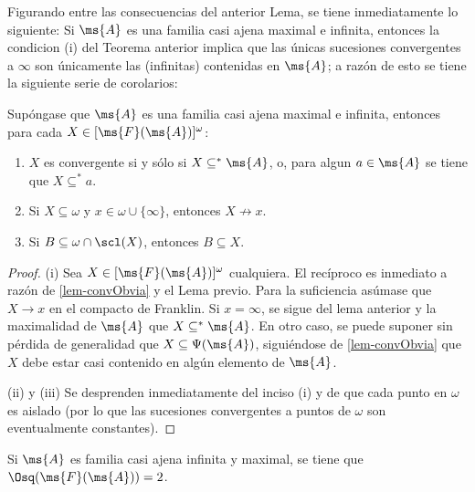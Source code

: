 	Figurando entre las consecuencias del anterior Lema, se tiene inmediatamente lo siguiente: Si $\ms{A}$ es una familia casi ajena maximal e infinita, entonces la condicion (i) del Teorema anterior implica que las únicas sucesiones convergentes a $\infty$ son únicamente las (infinitas) contenidas en $\ms{A}$; a razón de esto se tiene la siguiente serie de corolarios:
	\begin{corolario}\label{cor-convMaximal}
		Supóngase que $\ms{A}$ es una familia casi ajena maximal e infinita, entonces para cada $X \in [\ms{F}(\ms{A})]^\omega$:
		\begin{enumerate}
			\item $X$ es convergente si y sólo si $X \subseteq^* \ms{A}$, o, para algun $a \in \ms{A}$ se tiene que $X \subseteq^* a$.
			\item Si $X \subseteq \omega$ y $x \in \omega \cup \{\infty\}$, entonces $X \not\to x$.
			\item Si $B \subseteq \omega \cap \scl(X)$, entonces $B \subseteq X$.
		\end{enumerate}
	\end{corolario}

	\begin{proof} 
		(i) Sea $X \in [\ms{F}(\ms{A})]^\omega$ cualquiera. El recíproco es inmediato a razón de \ref{lem-convObvia} y el Lema previo. Para la suficiencia asúmase que $X \to x$ en el compacto de Franklin. Si $x = \infty$, se sigue del lema anterior y la maximalidad de $\ms{A}$ que $X \subseteq^* \ms{A}$. En otro caso, se puede suponer sin pérdida de generalidad que $X \subseteq \Psi(\ms{A})$, siguiéndose de \ref{lem-convObvia} que $X$ debe estar casi contenido en algún elemento de $\ms{A}$.

		(ii) y (iii) Se desprenden inmediatamente del inciso (i) y de que cada punto en $\omega$ es aislado (por lo que las sucesiones convergentes a puntos de $\omega$ son eventualmente constantes).
	\end{proof} 

	\begin{corolario}
		Si $\ms{A}$ es familia casi ajena infinita y maximal, se tiene que $\Osq(\ms{F}(\ms{A})) = 2$.
	\end{corolario}

